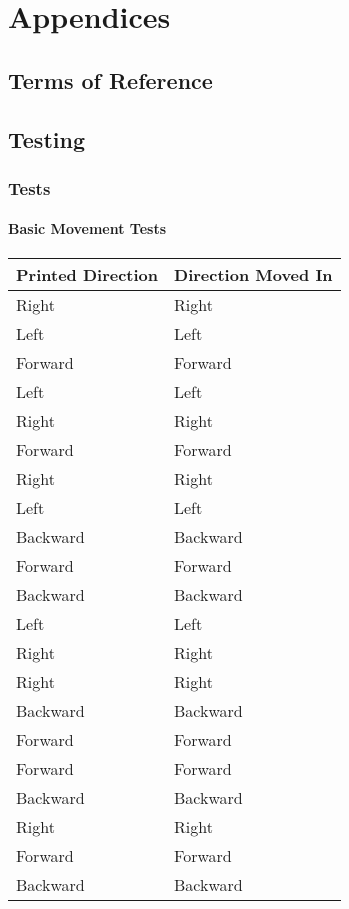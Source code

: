\part{Appendices}
	\chapter{Terms of Reference}
	
	\chapter{Testing}
	\label{testingappendices}
		\section{Tests}
		\label{testing:testlogs}
			\begin{landscape}
				\subsection{Basic Movement Tests}
				\begin{table}[h!]
					\centering
					\label{table:movementtestsbasic}
					\begin{tabular}{| l | l |} 
						\hline
						Printed Direction & Direction Moved In  \\ [0.5ex] 
						\hline
						Right & Right   \\
						Left & Left   \\ 
						Forward & Forward   \\ 
						Left & Left   \\ 
						Right & Right   \\ 
						Forward & Forward   \\ 
						Right & Right   \\ 
						Left & Left   \\ 
						Backward & Backward   \\ 
						Forward & Forward   \\ 
						Backward & Backward   \\ 
						Left & Left   \\ 
						Right & Right   \\ 
						Right & Right   \\ 
						Backward & Backward   \\ 
						Forward & Forward   \\ 
						Forward & Forward  \\ 
						Backward & Backward  \\ 
						Right & Right   \\ 
						Forward & Forward   \\ 
						Backward & Backward   \\ [1ex] 
						\hline
					\end{tabular}		
				\end{table}
			

\end{landscape}
